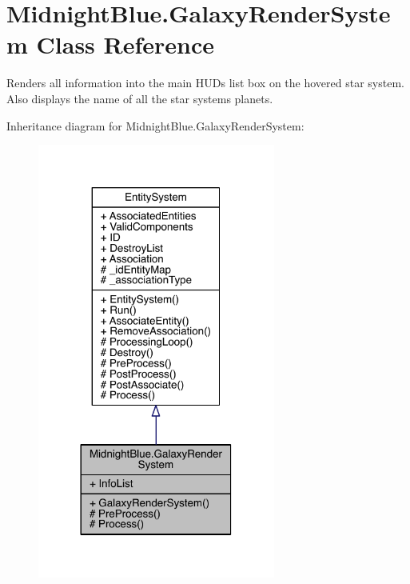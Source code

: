 \hypertarget{class_midnight_blue_1_1_galaxy_render_system}{}\section{Midnight\+Blue.\+Galaxy\+Render\+System Class Reference}
\label{class_midnight_blue_1_1_galaxy_render_system}


Renders all information into the main H\+UD\textquotesingle{}s list box on the hovered star system. Also displays the name of all the star systems planets.  




Inheritance diagram for Midnight\+Blue.\+Galaxy\+Render\+System\+:
\nopagebreak
\begin{figure}[H]
\begin{center}
\leavevmode
\includegraphics[width=221pt]{class_midnight_blue_1_1_galaxy_render_system__inherit__graph}
\end{center}
\end{figure}


